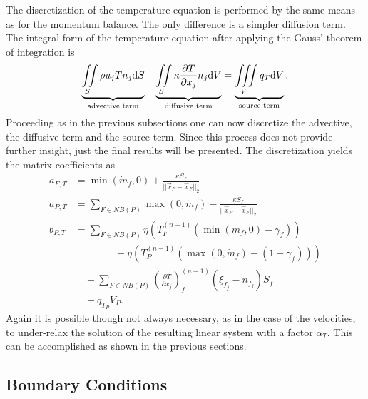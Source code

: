     The discretization of the temperature equation is performed by the same means as for the momentum balance. The only difference is a simpler diffusion term. The integral form of the temperature equation after applying the Gauss' theorem of integration is
    \begin{displaymath}
    \underbrace{ \iint\limits_S \rho u_j T n_j \mathrm{d}S }_{\text{advective term}}
    - \underbrace{ \iint\limits_S \kappa \frac{\partial T}{\partial x_j} n_j \mathrm{d}V }_{\text{diffusive term}}
    = \underbrace{\iiint\limits_V \vphantom{\frac{ T}{ x_j} } q_T \mathrm{d}V }_{\text{source term}}.
    \end{displaymath}
    Proceeding as in the previous subsections one can now discretize the advective, the diffusive term and the source term. Since this process does not provide further insight, just the final results will be presented. The discretization yields the matrix coefficients as
    \begin{subequations}
      \begin{align}
        a_{F,T} &= \min(\dot{m}_f,0) + \frac{\kappa S_f}{||\vec{x}_P - \vec{x}_F||_2} \\[1em]
        a_{P,T} &= \sum_{F \in NB(P)}\max(0,\dot{m}_f) - \frac{\kappa S_f}{||\vec{x}_P - \vec{x}_F||_2} \\[1em]
        b_{P,T} &= \sum_{F \in NB(P)} \eta  \left(T_F^{(n-1)} \left( \min(\dot{m}_f,0) - \gamma_f \right)\right) \nonumber \\
                &\quad \quad \quad  \quad+ \eta \left( T_{P}^{(n-1)} \left( \max(0,\dot{m}_f) - \left(1 - \gamma_f\right) \right)\right) \nonumber \\[0.5em]
                &\quad + \sum_{F \in NB(P)} \left( \frac{\partial T}{\partial x_j}\right)_f^{(n-1)} \left(\xi_{f_j} - n_{f_j}\right)S_f \nonumber \\[0.5em]
                &\quad + q_{T_P} V_P.
      \end{align}
    \end{subequations}
    Again it is possible though not always necessary, as in the case of the velocities, to under-relax the solution of the resulting linear system with a factor \(\alpha_T\). This can be accomplished as shown in the previous sections.

  \subsection{Boundary Conditions}
  \label{sec:segboundary}


